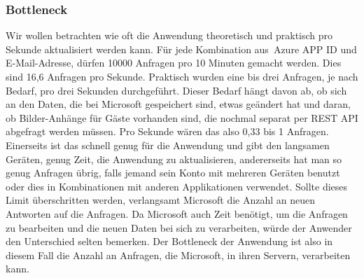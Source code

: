 \subsubsection{Bottleneck}\label{subsubsec:test-bottleneck}
\newline
\newline
{}
Wir wollen betrachten wie oft die Anwendung theoretisch und praktisch pro Sekunde aktualisiert werden kann.
Für jede Kombination aus~\gls{Azure APP ID} und E-Mail-Adresse, dürfen 10000 Anfragen pro 10 Minuten gemacht werden.
Dies sind 16,6 Anfragen pro Sekunde.
Praktisch wurden eine bis drei Anfragen, je nach Bedarf, pro drei Sekunden durchgeführt.
Dieser Bedarf hängt davon ab, ob sich an den Daten, die bei Microsoft gespeichert sind, etwas geändert hat und daran, ob Bilder-Anhänge für Gäste vorhanden sind, die nochmal separat per REST API abgefragt werden müssen.
Pro Sekunde wären das also 0,33 bis 1 Anfragen.
Einerseits ist das schnell genug für die Anwendung und gibt den langsamen Geräten, genug Zeit, die Anwendung zu aktualisieren, andererseits hat man so genug Anfragen übrig, falls jemand sein Konto mit mehreren Geräten benutzt oder dies in Kombinationen mit anderen Applikationen verwendet.
Sollte dieses Limit überschritten werden, verlangsamt Microsoft die Anzahl an neuen Antworten auf die Anfragen.
Da Microsoft auch Zeit benötigt, um die Anfragen zu bearbeiten und die neuen Daten bei sich zu verarbeiten, würde der Anwender den Unterschied selten bemerken.
Der \gls{Bottleneck} der Anwendung ist also in diesem Fall die Anzahl an Anfragen, die Microsoft, in ihren Servern, verarbeiten kann.
\newline
\newline
